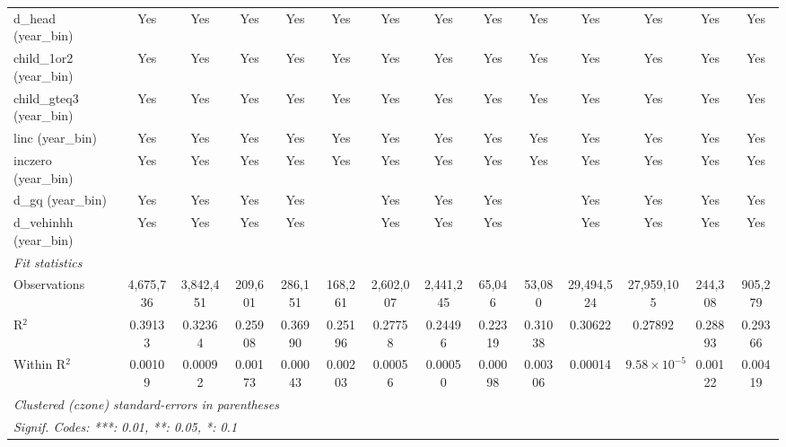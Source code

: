 \begin{tabular}{lccccccccccccc}
   d\_head (year\_bin)                     & Yes           & Yes           & Yes           & Yes          & Yes           & Yes           & Yes           & Yes          & Yes           & Yes           & Yes                   & Yes           & Yes\\  
   child\_1or2 (year\_bin)                 & Yes           & Yes           & Yes           & Yes          & Yes           & Yes           & Yes           & Yes          & Yes           & Yes           & Yes                   & Yes           & Yes\\  
   child\_gteq3 (year\_bin)                & Yes           & Yes           & Yes           & Yes          & Yes           & Yes           & Yes           & Yes          & Yes           & Yes           & Yes                   & Yes           & Yes\\  
   linc (year\_bin)                        & Yes           & Yes           & Yes           & Yes          & Yes           & Yes           & Yes           & Yes          & Yes           & Yes           & Yes                   & Yes           & Yes\\  
   inczero (year\_bin)                     & Yes           & Yes           & Yes           & Yes          & Yes           & Yes           & Yes           & Yes          & Yes           & Yes           & Yes                   & Yes           & Yes\\  
   d\_gq (year\_bin)                       & Yes           & Yes           & Yes           & Yes          &               & Yes           & Yes           & Yes          &               & Yes           & Yes                   & Yes           & Yes\\  
   d\_vehinhh (year\_bin)                  & Yes           & Yes           & Yes           & Yes          &               & Yes           & Yes           & Yes          &               & Yes           & Yes                   & Yes           & Yes\\  
   \midrule
   \emph{Fit statistics}\\
   Observations                            & 4,675,736     & 3,842,451     & 209,601       & 286,151      & 168,261       & 2,602,007     & 2,441,245     & 65,046       & 53,080        & 29,494,524    & 27,959,105            & 244,308       & 905,279\\  
   R$^2$                                   & 0.39133       & 0.32364       & 0.25908       & 0.36990      & 0.25196       & 0.27758       & 0.24496       & 0.22319      & 0.31038       & 0.30622       & 0.27892               & 0.28893       & 0.29366\\  
   Within R$^2$                            & 0.00109       & 0.00092       & 0.00173       & 0.00043      & 0.00203       & 0.00056       & 0.00050       & 0.00098      & 0.00306       & 0.00014       & $9.58\times 10^{-5}$  & 0.00122       & 0.00419\\  
   \midrule \midrule
   \multicolumn{14}{l}{\emph{Clustered (czone) standard-errors in parentheses}}\\
   \multicolumn{14}{l}{\emph{Signif. Codes: ***: 0.01, **: 0.05, *: 0.1}}\\
\end{tabular}
\par\endgroup


